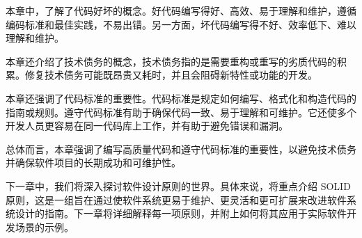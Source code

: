 本章中，了解了代码好坏的概念。好代码编写得好、高效、易于理解和维护，遵循编码标准和最佳实践，不易出错。另一方面，坏代码编写得不好、效率低下、难以理解和维护。

本章还介绍了技术债务的概念，技术债务指的是需要重构或重写的劣质代码的积累。修复技术债务可能既昂贵又耗时，并且会阻碍新特性或功能的开发。

本章还强调了代码标准的重要性。代码标准是规定如何编写、格式化和构造代码的指南或规则。遵守代码标准有助于确保代码一致、易于理解和可维护。它还使多个开发人员更容易在同一代码库上工作，并有助于避免错误和漏洞。

总体而言，本章强调了编写高质量代码和遵守代码标准的重要性，以避免技术债务并确保软件项目的长期成功和可维护性。

下一章中，我们将深入探讨软件设计原则的世界。具体来说，将重点介绍 SOLID 原则，这是一组旨在通过使软件系统更易于维护、更灵活和更可扩展来改进软件系统设计的指南。下一章将详细解释每一项原则，并附上如何将其应用于实际软件开发场景的示例。

